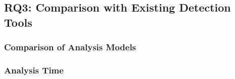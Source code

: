 \documentclass[pdflatex,sn-basic]{sn-jnl}%
\theoremstyle{thmstyleone}%
\theoremstyle{thmstyletwo}%
\theoremstyle{thmstylethree}%
\begin{document}
\subsection{RQ3: Comparison with Existing Detection Tools}\label{sec:rq3}


\subsubsection{Comparison of Analysis Models}\label{sec:rq3:models}


\subsubsection{Analysis Time}\label{sec:rq3:time}

\end{document}
